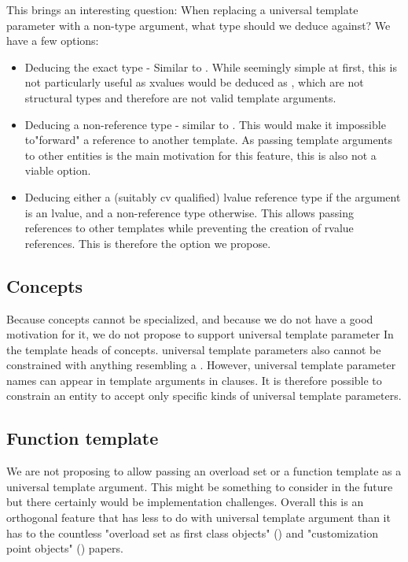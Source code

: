 \documentclass{wg21}
\begin{document}
This brings an interesting question: When replacing a universal template parameter with a non-type argument, what type should we deduce against?
We have a few options:
\begin{itemize}
\item Deducing the exact type -  Similar to . While seemingly simple at first, this is not particularly useful as xvalues would be deduced as , which are not structural types and therefore
are not valid template arguments.
\item Deducing a non-reference type - similar to . This would make it impossible to"forward" a reference to another template. As passing template arguments to other entities is the main motivation for this feature, this is also not a viable option.
\item Deducing either a (suitably cv qualified) lvalue reference type if the argument is an lvalue, and a non-reference type otherwise. This allows passing references to other templates while preventing the creation of rvalue references. This is therefore the option we propose.
\end{itemize}

\subsection{Concepts}

Because concepts cannot be specialized, and because we do not have a good motivation for it, we do not propose to support universal template parameter
In the template heads of concepts. universal template parameters also cannot be constrained with anything resembling a .
However, universal template parameter names can appear in template arguments in  clauses.
It is therefore possible to constrain an entity to accept only specific kinds of universal template parameters.


\subsection{Function template}


We are not proposing to allow passing an overload set or a function template as a universal template argument.
This might be something to consider in the future but there certainly would be implementation challenges.
Overall this is an orthogonal feature that has less to do with universal template argument than it has to the countless
"overload set as first class objects" () and "customization point objects" () papers.
\end{document}
